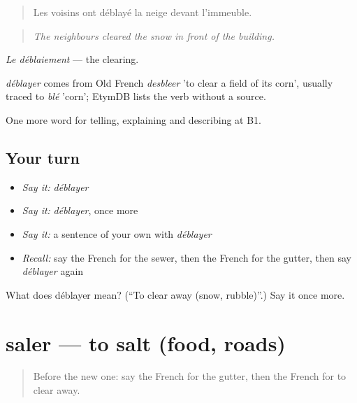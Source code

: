 \begin{quote}
Les voisins ont déblayé la neige devant l'immeuble.
\end{quote}

\begin{quote}
\emph{The neighbours cleared the snow in front of the building.}
\end{quote}

\emph{Le déblaiement} — the clearing.

\begin{cousinweb}
\emph{déblayer} comes from Old French \emph{desbleer} 'to clear a field of its corn', usually traced to \emph{blé} 'corn'; EtymDB lists the verb without a source.
\end{cousinweb}

\begin{grammarlens}[title={What you've built}]
One more word for telling, explaining and describing at B1.
\end{grammarlens}

\subsection*{Your turn}
\begin{itemize}
\raggedright
  \item \emph{Say it:} \emph{déblayer}
  \item \emph{Say it:} \emph{déblayer}, once more
  \item \emph{Say it:} a sentence of your own with \emph{déblayer}
  \item \emph{Recall:} say the French for the sewer, then the French for the gutter, then say \emph{déblayer} again
\end{itemize}

\begin{tcolorbox}[breakable,colback=teal!4,colframe=teal!35!black,title={Before you move on}]
What does déblayer mean? (\textquotedblleft{}To clear away (snow, rubble)\textquotedblright{}.) Say it once more.
\end{tcolorbox}
\section[saler]{saler — to salt (food, roads)}

\label{lesson:FR-C443-saler}



\begin{quote}
Before the new one: say the French for the gutter, then the French for to clear away.
\end{quote}

